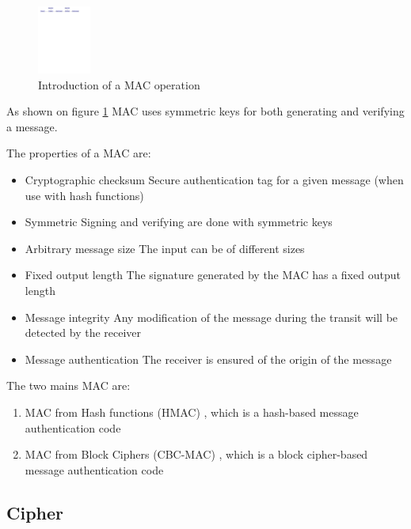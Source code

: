 \begin{figure}[!ht]
\centering
\includegraphics[trim=2cm 25.5cm 5cm 0cm,
height=2.25cm]{figures/intro_mac.pdf}
\caption{Introduction of a MAC operation}
\label{fig:mac}
\end{figure}

As shown on figure \ref{fig:mac} MAC uses symmetric keys for both generating and
verifying a message.

The properties of a MAC are:
\begin{itemize}
  \item Cryptographic checksum\newline
  Secure authentication tag for a given message (when use with hash functions)
  \item Symmetric\newline
  Signing and verifying are done with symmetric keys
  \item Arbitrary message size\newline
  The input can be of different sizes
  \item Fixed output length\newline
  The signature generated by the MAC has a fixed output length
  \item Message integrity\newline
  Any modification of the message during the transit will be detected by the
  receiver
  \item Message authentication\newline
  The receiver is ensured of the origin of the message
\end{itemize}

The two mains MAC are:
\begin{enumerate}[noitemsep]
  \item MAC from Hash functions (HMAC) \cite{wiki:hmac}, which is a hash-based
  message authentication code 
  \item MAC from Block Ciphers (CBC-MAC) \cite{wiki:cbcmac}, which is a block
  cipher-based message authentication code
\end{enumerate}

\subsection{Cipher}
\label{intro_cipher}

